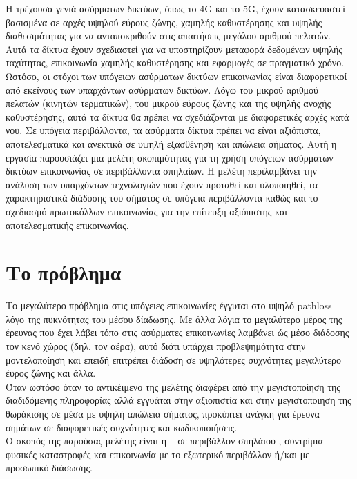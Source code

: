 \documentclass[12pt]{article}
\begin{document}
\begin{multicols*}{2}
        Η τρέχουσα γενιά ασύρματων δικτύων, όπως το 4G και το 5G, έχουν κατασκευαστεί
        βασισμένα σε αρχές υψηλού εύρους ζώνης, χαμηλής καθυστέρησης και υψηλής
        διαθεσιμότητας για να ανταποκριθούν στις απαιτήσεις μεγάλου αριθμού πελατών. Αυτά
        τα δίκτυα έχουν σχεδιαστεί για να υποστηρίζουν μεταφορά δεδομένων υψηλής
        ταχύτητας, επικοινωνία χαμηλής καθυστέρησης και εφαρμογές σε πραγματικό χρόνο.
        Ωστόσο, οι στόχοι των υπόγειων ασύρματων δικτύων επικοινωνίας είναι διαφορετικοί
        από εκείνους των υπαρχόντων ασύρματων δικτύων. Λόγω του μικρού αριθμού πελατών
        (κινητών τερματικών), του μικρού εύρους ζώνης και της υψηλής ανοχής καθυστέρησης,
        αυτά τα δίκτυα θα πρέπει να σχεδιάζονται με διαφορετικές αρχές κατά νου. Σε
        υπόγεια περιβάλλοντα, τα ασύρματα δίκτυα πρέπει να είναι αξιόπιστα, αποτελεσματικά
        και ανεκτικά σε υψηλή εξασθένηση και απώλεια σήματος.
        Αυτή η εργασία παρουσιάζει μια μελέτη σκοπιμότητας για τη χρήση υπόγειων ασύρματων
        δικτύων επικοινωνίας σε περιβάλλοντα σπηλαίων. Η μελέτη περιλαμβάνει την ανάλυση
        των υπαρχόντων τεχνολογιών που έχουν προταθεί και υλοποιηθεί, τα χαρακτηριστικά
        διάδοσης του σήματος σε υπόγεια περιβάλλοντα καθώς και το σχεδιασμό πρωτοκόλλων
        επικοινωνίας για την επίτευξη αξιόπιστης και αποτελεσματικής επικοινωνίας.

    \section{\normalsize \textsf{Το πρόβλημα}} Το μεγαλύτερο πρόβλημα στις υπόγειες
        επικοινωνίες έγγυται στο υψηλό pathloss λόγο της πυκνότητας του μέσου δίαδωσης. Με
        άλλα λόγια το μεγαλύτερο μέρος της έρευνας που έχει λάβει τόπο στις ασύρματες
        επικοινωνίες λαμβάνει ώς μέσο διάδοσης τον κενό χώρος (δηλ. τον αέρα), αυτό διότι
        υπάρχει προβλεψημότητα στην μοντελοποίηση και επειδή επιτρέπει διάδοση σε
        υψηλότερες συχνότητες μεγαλύτερο έυρος ζώνης και άλλα.\\
        Όταν ωστόσο όταν το αντικέιμενο της μελέτης διαφέρει από την μεγιστοποίηση της
        διαδιδόμενης πληροφορίας αλλά εγγυάται στην αξιοπιστία και στην μεγιστοποιηση της
        θωράκισης σε μέσα με υψηλή απώλεια σήματος, προκύπτει ανάγκη για έρευνα σημάτων σε
        διαφορετικές συχνότητες και κωδικοποιήσεις.\\
        Ο σκοπός της παρούσας μελέτης είναι η -- σε περιβάλλον σπηλάιου , συντρίμια
        φυσικές καταστροφές και επικοινωνία με το εξωτερικό περιβάλλον ή/και με προσωπικό
        διάσωσης.


\end{multicols*}
\end{document}
